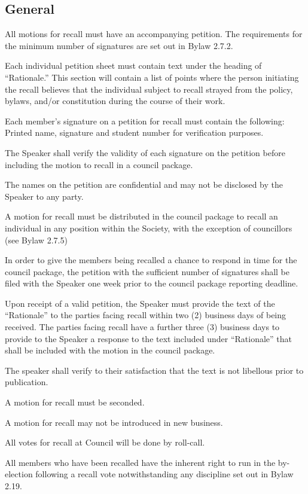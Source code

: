 \subsection{General}
\begin{longenum}[ label*=\thesubsection.\arabic*., align=left]
	\item  All motions for recall must have an accompanying petition. The requirements for the minimum number of signatures are set out in Bylaw 2.7.2.
	\begin{longenum}[ label*=\arabic*., align=left]
		\item Each individual petition sheet must contain text under the heading of ``Rationale.''  This section will contain a list of points where the person initiating the recall believes that the individual subject to recall strayed from the policy, bylaws, and/or constitution during the course of their work.
        \item Each member's signature on a petition for recall must contain the following: Printed name, signature and student number for verification purposes.
        \item The Speaker shall verify the validity of each signature on the petition before including the motion to recall in a council package.
        \item The names on the petition are confidential and may not be disclosed by the Speaker to any party.
    \end{longenum}
    \item A motion for recall must be distributed in the council package to recall an individual in any position within the Society, with the exception of councillors (see Bylaw 2.7.5)
    \item In order to give the members being recalled a chance to respond in time for the council package, the petition with the sufficient number of signatures shall be filed with the Speaker one week prior to the council package reporting deadline.
    \item Upon receipt of a valid petition, the Speaker must provide the text of the ``Rationale'' to the parties facing recall within two (2) business days of being received. The parties facing recall have a further three (3) business days to provide to the Speaker a response to the text included under ``Rationale'' that shall be included with the motion in the council package.
    \item The speaker shall verify to their satisfaction that the text is not libellous prior to publication.
    \item A motion for recall must be seconded.
    \item A motion for recall may not be introduced in new business.
    \item All votes for recall at Council will be done by roll-call.
    \item All members who have been recalled have the inherent right to run in the by-election following a recall vote notwithstanding any discipline set out in Bylaw 2.19.
\end{longenum}

